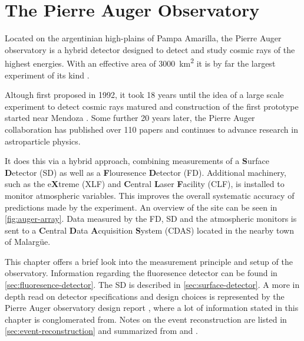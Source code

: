 
\chapter{The Pierre Auger Observatory}
\label{chap:auger-observatory}

Located on the argentinian high-plains of Pampa Amarilla, the Pierre Auger observatory is a hybrid detector designed to detect and study cosmic rays of the highest
energies. With an effective area of \SI{3000}{\kilo\meter\squared} it is by far the largest experiment of its kind \cite{DesignReport}.

Altough first proposed in 1992, it took 18 years until the idea of a large scale experiment to detect cosmic rays matured and construction of the first prototype 
started near Mendoza \cite{AugerTimeline}. Some further 20 years later, the Pierre Auger collaboration has published over 110 papers \cite{PCollab} and continues to 
advance research in astroparticle physics.

It does this via a hybrid approach, combining measurements of a \textbf{S}urface \textbf{D}etector (SD) as well as a \textbf{F}louresence \textbf{D}etector (FD). 
Additional machinery, such as the e\textbf{X}treme (XLF) and \textbf{C}entral \textbf{L}aser \textbf{F}acility (CLF), is installed to monitor atmospheric 
variables. This improves the overall systematic accuracy of predictions made by the experiment. An overview of the site can be seen in \autoref{fig:auger-array}. 
Data measured by the FD, SD and the atmospheric monitors is sent to a \textbf{C}entral \textbf{D}ata \textbf{A}cquisition \textbf{S}ystem (CDAS) located in the 
nearby town of Malargüe.

This chapter offers a brief look into the measurement principle and setup of the observatory. Information regarding the fluoresence detector can be found in 
\autoref{sec:fluoresence-detector}. The SD is described in \autoref{sec:surface-detector}. A more in depth read on detector specifications and design choices is 
represented by the Pierre Auger observatory design report \cite{DesignReport}, where a lot of information stated in this chapter is conglomerated from. Notes on 
the event reconstruction are listed in \autoref{sec:event-reconstruction} and summarized from \cite{SDReconstruction} and \cite{FDReconstruction}.

